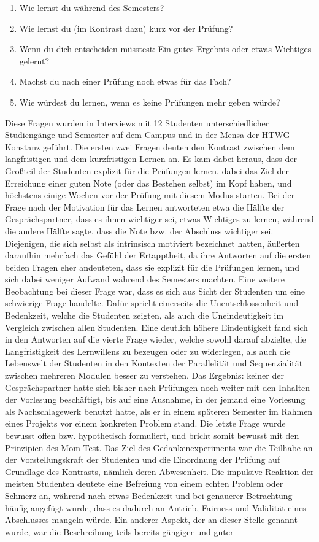 \begin{enumerate}
    \item Wie lernst du während des Semesters?
    \item Wie lernst du (im Kontrast dazu) kurz vor der Prüfung?
    \item Wenn du dich entscheiden müsstest: Ein gutes Ergebnis oder etwas Wichtiges gelernt?
    \item Machst du nach einer Prüfung noch etwas für das Fach?
    \item Wie würdest du lernen, wenn es keine Prüfungen mehr geben würde?
\end{enumerate}
Diese Fragen wurden in Interviews mit 12 Studenten unterschiedlicher Studiengänge und Semester auf dem Campus und in der Mensa der HTWG Konstanz geführt. Die ersten zwei Fragen deuten den Kontrast zwischen dem langfristigen und dem kurzfristigen Lernen an. Es kam dabei heraus, dass der Großteil der Studenten explizit für die Prüfungen lernen, dabei das Ziel der Erreichung einer guten Note (oder das Bestehen selbst) im Kopf haben, und höchstens einige Wochen vor der Prüfung mit diesem Modus starten. Bei der Frage nach der Motivation für das Lernen antworteten etwa die Hälfte der Gesprächspartner, dass es ihnen wichtiger sei, etwas Wichtiges zu lernen, während die andere Hälfte sagte, dass die Note bzw. der Abschluss wichtiger sei. Diejenigen, die sich selbst als intrinsisch motiviert bezeichnet hatten, äußerten daraufhin mehrfach das Gefühl der Ertapptheit, da ihre Antworten auf die ersten beiden Fragen eher andeuteten, dass sie explizit für die Prüfungen lernen, und sich dabei weniger Aufwand während des Semesters machten. Eine weitere Beobachtung bei dieser Frage war, dass es sich aus Sicht der Studenten um eine schwierige Frage handelte. Dafür spricht einerseits die Unentschlossenheit und Bedenkzeit, welche die Studenten zeigten, als auch die Uneindeutigkeit im Vergleich zwischen allen Studenten. Eine deutlich höhere Eindeutigkeit fand sich in den Antworten auf die vierte Frage wieder, welche sowohl darauf abzielte, die Langfristigkeit des Lernwillens zu bezeugen oder zu widerlegen, als auch die Lebenswelt der Studenten in den Kontexten der Parallelität und Sequenzialität zwischen mehreren Modulen besser zu verstehen. Das Ergebnis: keiner der Gesprächspartner hatte sich bisher nach Prüfungen noch weiter mit den Inhalten der Vorlesung beschäftigt, bis auf eine Ausnahme, in der jemand eine Vorlesung als Nachschlagewerk benutzt hatte, als er in einem späteren Semester im Rahmen eines Projekts vor einem konkreten Problem stand. Die letzte Frage wurde bewusst offen bzw. hypothetisch formuliert, und bricht somit bewusst mit den Prinzipien des Mom Test. Das Ziel des Gedankenexperiments war die Teilhabe an der Vorstellungskraft der Studenten und die Einordnung der Prüfung auf Grundlage des Kontrasts, nämlich deren Abwesenheit. Die impulsive Reaktion der meisten Studenten deutete eine Befreiung von einem echten Problem oder Schmerz an, während nach etwas Bedenkzeit und bei genauerer Betrachtung häufig angefügt wurde, dass es dadurch an Antrieb, Fairness und Validität eines Abschlusses mangeln würde. Ein anderer Aspekt, der an dieser Stelle genannt wurde, war die Beschreibung teils bereits gängiger und guter 